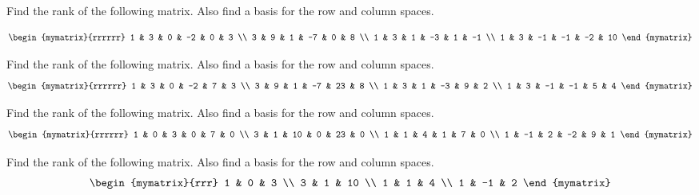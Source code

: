 \begin{enumialphparenastyle}

\begin{ex} Find the rank of the following matrix. Also find a basis for the row
and column spaces.

\begin{equation*}
\begin{mymatrix}{rrrrrr}
1 & 3 & 0 & -2 & 0 & 3 \\ 
3 & 9 & 1 & -7 & 0 & 8 \\ 
1 & 3 & 1 & -3 & 1 & -1 \\ 
1 & 3 & -1 & -1 & -2 & 10
\end{mymatrix} 
\end{equation*}
\end{ex}

\begin{ex} Find the rank of the following matrix. Also find a basis for the row
and column spaces.
\begin{equation*}
\begin{mymatrix}{rrrrrr}
1 & 3 & 0 & -2 & 7 & 3 \\ 
3 & 9 & 1 & -7 & 23 & 8 \\ 
1 & 3 & 1 & -3 & 9 & 2 \\ 
1 & 3 & -1 & -1 & 5 & 4
\end{mymatrix} 
\end{equation*}
\end{ex}

\begin{ex} Find the rank of the following matrix. Also find a basis for the row
and column spaces.
\begin{equation*}
\begin{mymatrix}{rrrrrr}
1 & 0 & 3 & 0 & 7 & 0 \\ 
3 & 1 & 10 & 0 & 23 & 0 \\ 
1 & 1 & 4 & 1 & 7 & 0 \\ 
1 & -1 & 2 & -2 & 9 & 1
\end{mymatrix}
\end{equation*}
\end{ex}

\begin{ex} Find the rank of the following matrix. Also find a basis for the row
and column spaces. 
\begin{equation*}
\begin{mymatrix}{rrr}
1 & 0 & 3 \\ 
3 & 1 & 10 \\ 
1 & 1 & 4 \\ 
1 & -1 & 2
\end{mymatrix}
\end{equation*}
\end{ex}


\end{enumialphparenastyle}
